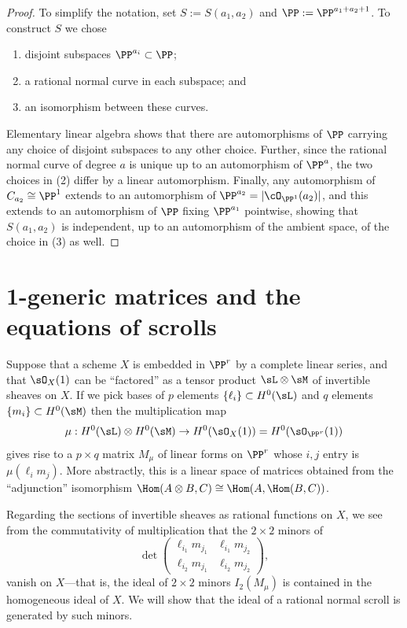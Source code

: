 \begin{proof} 
To simplify the notation, set $S := S(a_{1}, a_{2})$ and $\PP := \PP^{a_1+a_2+1}$.
To construct $S$ we chose 
\begin{enumerate}
 \item disjoint subspaces $\PP^{a_i}\subset \PP$;
 \item a rational normal curve in each subspace; and
 \item an isomorphism between these curves.
\end{enumerate}
Elementary linear algebra shows that there are automorphisms of $\PP$ carrying any choice of disjoint subspaces to any other choice. Further, since the rational normal curve of degree $a$ is unique up to an automorphism of $\PP^{a}$, the two choices in (2) differ by a linear automorphism. Finally, any automorphism of $C_{a_{2}}\cong \PP^{1}$ extends to an automorphism of $\PP^{a_{2}} = |\cO_{\PP^{1}}(a_{2})|$, and this extends to an automorphism of $\PP$ fixing $\PP^{a_{1}}$ pointwise,
showing that $S(a_{1}, a_{2})$ is independent, up to an automorphism of the ambient space, of the choice in (3)  as well.
\end{proof}



\section{1-generic matrices and the equations of scrolls}\label{particular name}

Suppose that a scheme $X $ is embedded in $\PP^r$ by a complete linear series, and that
$\sO_X(1)$ can be ``factored'' as a tensor product $\sL\otimes \sM$ of invertible sheaves on $X$. If we pick bases of $p$  elements $\{\ell_i\}\subset H^0(\sL)$ and  $q$  elements $\{m_i\} \subset H^0(\sM)$ then the multiplication map 
$$
\mu: H^0(\sL) \otimes H^0(\sM) \to H^0(\sO_{X}(1))= H^0(\sO_{\PP^r}(1))
$$
 gives rise to 
a $p\times q$ matrix $M_\mu$ of linear forms on $\PP^r$ whose $i,j$ entry is $\mu(\ell_im_j)$.
More abstractly, this is a linear space of matrices obtained from the ``adjunction'' isomorphism 
$\Hom(A\otimes B, C)\cong \Hom(A, \Hom(B,C))$.

Regarding the sections of invertible sheaves as rational functions on $X$, we see from the commutativity of
multiplication that the $2\times 2$ minors
of 
$$
\det \begin{pmatrix}
\ell_{i_1}m_{j_1} & \ell_{i_1}m_{j_2}\\
\ell_{i_2}m_{j_1} &\ell_{i_2}m_{j_2}  
\end{pmatrix},
$$
vanish on $X$---that is, the ideal of $2\times 2$ minors $I_2(M_\mu)$ is contained in the homogeneous ideal
of $X$. We will show that the ideal of a rational normal scroll is generated by such minors.

